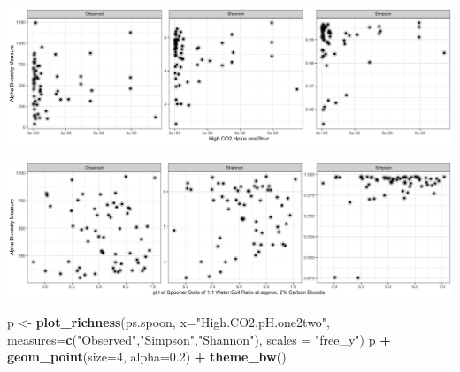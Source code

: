 \documentclass[]{article}
\newenvironment{Shaded}{\begin{snugshade}}{\end{snugshade}}
\newcommand{\DataTypeTok}[1]{\textcolor[rgb]{0.13,0.29,0.53}{#1}}
\newcommand{\DecValTok}[1]{\textcolor[rgb]{0.00,0.00,0.81}{#1}}
\newcommand{\FloatTok}[1]{\textcolor[rgb]{0.00,0.00,0.81}{#1}}
\newcommand{\KeywordTok}[1]{\textcolor[rgb]{0.13,0.29,0.53}{\textbf{#1}}}
\newcommand{\NormalTok}[1]{#1}
\newcommand{\OperatorTok}[1]{\textcolor[rgb]{0.81,0.36,0.00}{\textbf{#1}}}
\newcommand{\StringTok}[1]{\textcolor[rgb]{0.31,0.60,0.02}{#1}}
\begin{document}
\includegraphics{output-rmd/richness-ph-High.CO2.Hplus.one2four.wisc-1.png}

\begin{Shaded}
\end{Shaded}

\includegraphics{output-rmd/richness-ph-High.CO2.pH.one2one.spoon-1.png}

\begin{Shaded}
\begin{Highlighting}[]
\NormalTok{p <-}\StringTok{ }\KeywordTok{plot_richness}\NormalTok{(ps.spoon, }\DataTypeTok{x=}\StringTok{"High.CO2.pH.one2two"}\NormalTok{, }\DataTypeTok{measures=}\KeywordTok{c}\NormalTok{(}\StringTok{"Observed"}\NormalTok{,}\StringTok{"Simpson"}\NormalTok{,}\StringTok{"Shannon"}\NormalTok{), }\DataTypeTok{scales =} \StringTok{"free_y"}\NormalTok{)}
\NormalTok{p }\OperatorTok{+}\StringTok{ }\KeywordTok{geom_point}\NormalTok{(}\DataTypeTok{size=}\DecValTok{4}\NormalTok{, }\DataTypeTok{alpha=}\FloatTok{0.2}\NormalTok{) }\OperatorTok{+}\StringTok{ }\KeywordTok{theme_bw}\NormalTok{()}
\end{Highlighting}
\end{Shaded}
\end{document}
